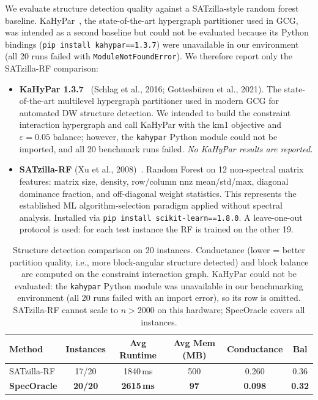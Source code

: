 \documentclass[11pt]{article}
\begin{document}
We evaluate structure detection quality against a SATzilla-style random forest baseline. KaHyPar~\cite{kahypar}, the state-of-the-art hypergraph partitioner used in GCG, was intended as a second baseline but could not be evaluated because its Python bindings (\texttt{pip install kahypar==1.3.7}) were unavailable in our environment (all 20 runs failed with \texttt{ModuleNotFoundError}). We therefore report only the SATzilla-RF comparison:

\begin{itemize}[leftmargin=*]
\item \textbf{KaHyPar 1.3.7}~\cite{kahypar} (Schlag et al., 2016; Gottesbüren et al., 2021). The state-of-the-art multilevel hypergraph partitioner used in modern GCG for automated DW structure detection. We intended to build the constraint interaction hypergraph and call KaHyPar with the km1 objective and $\varepsilon=0.05$ balance; however, the \texttt{kahypar} Python module could not be imported, and all 20 benchmark runs failed. \emph{No KaHyPar results are reported.}

\item \textbf{SATzilla-RF} (Xu et al., 2008)~\cite{xu2008}. Random Forest on 12 non-spectral matrix features: matrix size, density, row/column nnz mean/std/max, diagonal dominance fraction, and off-diagonal weight statistics. This represents the established ML algorithm-selection paradigm applied without spectral analysis. Installed via \texttt{pip install scikit-learn==1.8.0}. A leave-one-out protocol is used: for each test instance the RF is trained on the other 19.
\end{itemize}

\begin{table}[h]
\centering
\caption{Structure detection comparison on 20 instances. Conductance (lower = better partition quality, i.e., more block-angular structure detected) and block balance are computed on the constraint interaction graph. KaHyPar could not be evaluated: the \texttt{kahypar} Python module was unavailable in our benchmarking environment (all 20 runs failed with an import error), so its row is omitted. SATzilla-RF cannot scale to $n > 2000$ on this hardware; SpecOracle covers all instances.}
\label{tab:sota-comparison}
\begin{tabular}{lccccc}
\toprule
\textbf{Method} & \textbf{Instances} & \textbf{Avg Runtime} & \textbf{Avg Mem (MB)} & \textbf{Conductance} & \textbf{Bal} \\
\midrule
SATzilla-RF     & 17/20 & 1840\,ms & 500  & 0.260 & 0.36 \\
\textbf{SpecOracle}    & \textbf{20/20} & \textbf{2615\,ms} & \textbf{97}   & \textbf{0.098} & \textbf{0.32} \\
\bottomrule
\end{tabular}
\end{table}
\end{document}
